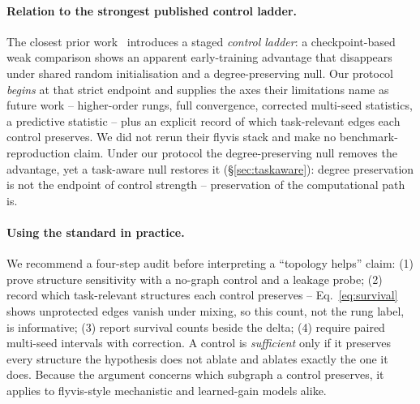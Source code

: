 \documentclass[10pt,twocolumn,letterpaper]{article}
\begin{document}
\paragraph{Relation to the strongest published control ladder.}
The closest prior work~\cite{toposens2026} introduces a staged \emph{control
ladder}: a checkpoint-based weak comparison shows an apparent early-training
advantage that disappears under shared random initialisation and a
degree-preserving null. Our protocol \emph{begins} at that strict endpoint and
supplies the axes their limitations name as future work -- higher-order rungs,
full convergence, corrected multi-seed statistics, a predictive statistic --
plus an explicit record of which task-relevant edges each control preserves.
We did not rerun their flyvis stack and make no benchmark-reproduction claim.
Under our protocol the degree-preserving null removes the advantage, yet a
task-aware null restores it (\S\ref{sec:taskaware}): degree preservation is not
the endpoint of control strength -- preservation of the computational path is.

\paragraph{Using the standard in practice.}
We recommend a four-step audit before interpreting a ``topology helps''
claim: (1) prove structure sensitivity with a no-graph control and a leakage
probe; (2) record which task-relevant structures each control preserves --
Eq.~\eqref{eq:survival} shows unprotected edges vanish under mixing, so this
count, not the rung label, is informative; (3) report survival counts beside
the delta; (4) require paired multi-seed intervals with correction. A control
is \emph{sufficient} only if it preserves every structure the hypothesis does
not ablate and ablates exactly the one it does. Because the argument concerns
which subgraph a control preserves, it applies to flyvis-style mechanistic and
learned-gain models alike.
\end{document}
